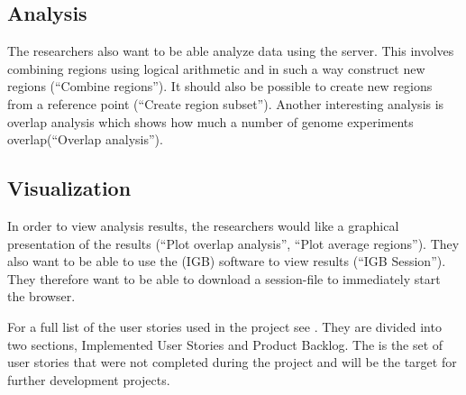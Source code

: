 \subsection{Analysis}
The researchers also want to be able analyze data using the server. This involves combining regions using logical arithmetic and in such a way construct new regions (``Combine regions''). It should also be possible to create new regions from a reference point (``Create region subset''). Another interesting analysis is overlap analysis which shows how much a number of genome experiments overlap(``Overlap analysis'').

\subsection{Visualization}
In order to view analysis results, the researchers would like a graphical presentation of the results (``Plot overlap analysis'', ``Plot average regions''). They also want to be able to use the  (IGB)\cite{IGB} software to view results (``IGB Session''). They therefore want to be able to download a session-file to immediately start the browser.

For a full list of the user stories used in the project see . They are divided into two sections, Implemented User Stories and Product Backlog. The  is the set of user stories that were not completed during the project and will be the target for further development projects.